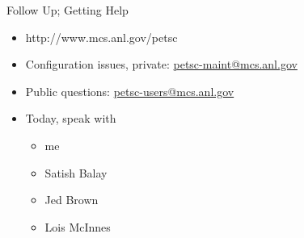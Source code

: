 \begin{frame}{Follow Up; Getting Help}
  \begin{itemize}
    \item http://www.mcs.anl.gov/petsc
    \item Configuration issues, private: \url{petsc-maint@mcs.anl.gov}
    \item Public questions: \url{petsc-users@mcs.anl.gov}
    \item Today, speak with
    \begin{itemize}
      \item me
      \item Satish Balay
      \item Jed Brown
      \item Lois McInnes
    \end{itemize}
  \end{itemize}
\end{frame}
